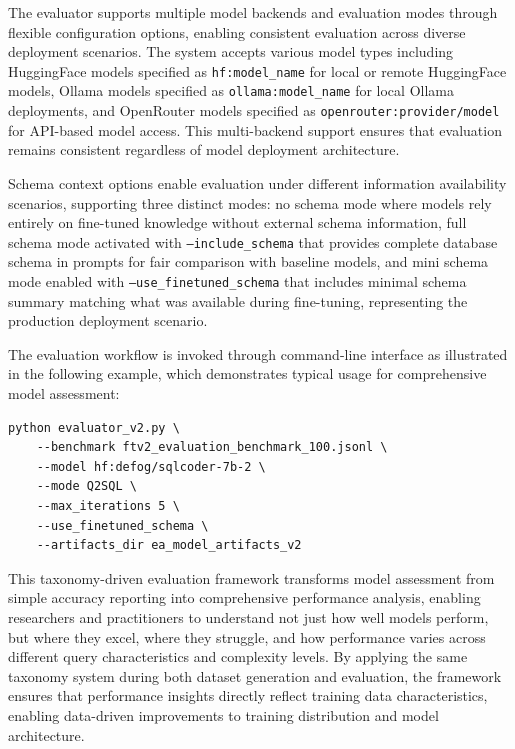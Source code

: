 The evaluator supports multiple model backends and evaluation modes through flexible configuration options, enabling consistent evaluation across diverse deployment scenarios. The system accepts various model types including HuggingFace models specified as \texttt{hf:model\_name} for local or remote HuggingFace models, Ollama models specified as \texttt{ollama:model\_name} for local Ollama deployments, and OpenRouter models specified as \texttt{openrouter:provider/model} for API-based model access. This multi-backend support ensures that evaluation remains consistent regardless of model deployment architecture.

Schema context options enable evaluation under different information availability scenarios, supporting three distinct modes: no schema mode where models rely entirely on fine-tuned knowledge without external schema information, full schema mode activated with \texttt{--include\_schema} that provides complete database schema in prompts for fair comparison with baseline models, and mini schema mode enabled with \texttt{--use\_finetuned\_schema} that includes minimal schema summary matching what was available during fine-tuning, representing the production deployment scenario.

The evaluation workflow is invoked through command-line interface as illustrated in the following example, which demonstrates typical usage for comprehensive model assessment:

\begin{lstlisting}[style=pythonstyle, caption=Evaluator v2 usage example]
python evaluator_v2.py \
    --benchmark ftv2_evaluation_benchmark_100.jsonl \
    --model hf:defog/sqlcoder-7b-2 \
    --mode Q2SQL \
    --max_iterations 5 \
    --use_finetuned_schema \
    --artifacts_dir ea_model_artifacts_v2
\end{lstlisting}

This taxonomy-driven evaluation framework transforms model assessment from simple accuracy reporting into comprehensive performance analysis, enabling researchers and practitioners to understand not just how well models perform, but where they excel, where they struggle, and how performance varies across different query characteristics and complexity levels. By applying the same taxonomy system during both dataset generation and evaluation, the framework ensures that performance insights directly reflect training data characteristics, enabling data-driven improvements to training distribution and model architecture.

